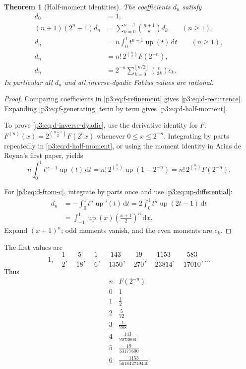 \documentclass[11pt]{article}
\numberwithin{equation}{section}
\newtheorem{theorem}{Theorem}[section]
\theoremstyle{definition}
\theoremstyle{remark}
\newcommand{\upf}{\operatorname{up}}
\newcommand{\dd}{\,\mathrm d}
\newcommand{\floor}[1]{\left\lfloor#1\right\rfloor}
\begin{document}
\begin{theorem}[Half-moment identities]\label{p3:thm:moment-identities}
The coefficients $d_n$ satisfy
\begin{align}
 d_0&=1,\label{p3:eq:d0}\\
 (n+1)(2^n-1)d_n
 &=\sum_{k=0}^{n-1}\binom{n+1}{k}d_k\qquad(n\ge1),\label{p3:eq:d-recurrence}\\
 d_n&=n\int_0^1t^{n-1}\upf(t)\dd t\qquad(n\ge1),\label{p3:eq:d-half-moment}\\
 d_n&=n!\,2^{\binom n2}F(2^{-n}),\label{p3:eq:d-inverse-dyadic}\\
 d_n&=2^{-n}\sum_{k=0}^{\floor{n/2}}\binom n{2k}c_k.\label{p3:eq:d-from-c}
\end{align}
In particular all $d_n$ and all inverse-dyadic Fabius values are rational.
\end{theorem}

\begin{proof}
Comparing coefficients in \eqref{p3:eq:f-refinement} gives \eqref{p3:eq:d-recurrence}.  Expanding \eqref{p3:eq:f-generating} term by term gives \eqref{p3:eq:d-half-moment}.

To prove \eqref{p3:eq:d-inverse-dyadic}, use the derivative identity for $F$:
$F^{(n)}(x)=2^{\binom{n+1}{2}}F(2^nx)$ whenever $0\le x\le2^{-n}$.  Integrating by parts repeatedly in \eqref{p3:eq:d-half-moment}, or using the moment identity in Arias de Reyna's first paper, yields
\[
 n\int_0^1t^{n-1}\upf(t)\dd t
 =n!\,2^{\binom n2}\upf(1-2^{-n})
 =n!\,2^{\binom n2}F(2^{-n}).
\]

For \eqref{p3:eq:d-from-c}, integrate by parts once and use \eqref{p3:eq:up-differential}:
\begin{align*}
 d_n
 &= -\int_0^1t^n\upf'(t)\dd t
 =2\int_0^1t^n\upf(2t-1)\dd t\\
 &=\int_{-1}^{1}\upf(x)\left(\frac{x+1}{2}\right)^n\dd x.
\end{align*}
Expand $(x+1)^n$; odd moments vanish, and the even moments are $c_k$.
\end{proof}

The first values are
\begin{equation}\label{p3:eq:d-values}
 1,\quad \frac12,\quad \frac5{18},\quad \frac16,\quad
 \frac{143}{1350},\quad \frac{19}{270},\quad
 \frac{1153}{23814},\quad \frac{583}{17010},\ldots
\end{equation}
Thus
\begin{equation}\label{p3:eq:inverse-dyadic-table-small}
\begin{array}{c|c}
 n&F(2^{-n})\\ \hline
 0&1\\
 1&\frac12\\
 2&\frac5{72}\\
 3&\frac1{288}\\
 4&\frac{143}{2073600}\\
 5&\frac{19}{33177600}\\
 6&\frac{1153}{561842749440}
\end{array}
\end{equation}
\end{document}
